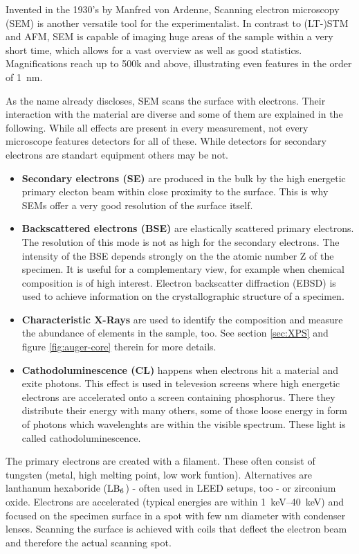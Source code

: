 Invented in the 1930's by Manfred von Ardenne\cite{ardenne_elektronen-rastermikroskop_1938}, Scanning electron microscopy (SEM) is another versatile tool for the experimentalist. In contrast to (LT-)STM and AFM, SEM is capable of imaging huge areas of the sample within a very short time, which allows for a vast overview as well as good statistics. Magnifications reach up to 500k and above, illustrating even features in the order of \SI{1}{\nano \meter}.

As the name already discloses, SEM scans the surface with electrons. Their interaction with the material are diverse and some of them are explained in the following. While all effects are present in every measurement, not every microscope features detectors for all of these. While detectors for secondary electrons are standart equipment others may be not.

\begin{itemize}
 \item \textbf{Secondary electrons (SE)} are produced in the bulk by the high energetic primary electon beam within close proximity to the surface. This is why SEMs offer a very good resolution of the surface itself.
  \item \textbf{Backscattered electrons (BSE)} are elastically scattered primary electrons. The resolution of this mode is not as high for the secondary electrons. The intensity of the BSE depends strongly on the the atomic number Z of the specimen. It is useful for a complementary view, for example when chemical composition is of high interest.
  Electron backscatter diffraction (EBSD) is used to achieve information on the crystallographic structure of a specimen.
 \item \textbf{Characteristic X-Rays} are used to identify the composition and measure the abundance of elements in the sample, too. See section \ref{sec:XPS} and figure \ref{fig:auger-core} therein for more details.
 \item \textbf{Cathodoluminescence (CL)} happens when electrons hit a material and exite photons. This effect is used in televesion screens where high energetic electrons are accelerated onto a screen containing phosphorus. There they distribute their energy with many others, some of those loose energy in form of photons which wavelenghts are within the visible spectrum. These light is called cathodoluminescence.
 \end{itemize}

The primary electrons are created with a filament. These often consist of tungsten (metal, high melting point, low work funtion). Alternatives are lanthanum hexaboride ($\textnormal{LB}_6$) - often used in LEED setups, too - or zirconium oxide.
Electrons are accelerated (typical energies are within \SIrange{1}{40}{\kilo \eV}) and focused on the specimen surface in a spot with few \si{nm} diameter with condenser lenses. Scanning the surface is achieved with coils that deflect the electron beam and therefore the actual scanning spot.

